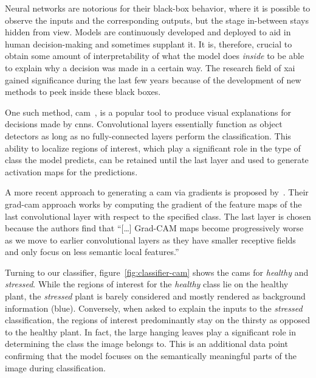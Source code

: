 \documentclass[draft,final]{vutinfth} %
\begin{document}
Neural networks are notorious for their black-box behavior, where it
is possible to observe the inputs and the corresponding outputs, but
the stage in-between stays hidden from view. Models are continuously
developed and deployed to aid in human decision-making and sometimes
supplant it. It is, therefore, crucial to obtain some amount of
interpretability of what the model does \emph{inside} to be able to
explain why a decision was made in a certain way. The research field
of \gls{xai} gained significance during the last few years because of
the development of new methods to peek inside these black boxes.

One such method, \gls{cam}~\cite{zhou2015}, is a popular tool to
produce visual explanations for decisions made by
\glspl{cnn}. Convolutional layers essentially function as object
detectors as long as no fully-connected layers perform the
classification. This ability to localize regions of interest, which
play a significant role in the type of class the model predicts, can
be retained until the last layer and used to generate activation maps
for the predictions.

A more recent approach to generating a \gls{cam} via gradients is
proposed by~\textcite{selvaraju2020}. Their \gls{grad-cam} approach
works by computing the gradient of the feature maps of the last
convolutional layer with respect to the specified class. The last
layer is chosen because the authors find that ``[…]  Grad-CAM maps
become progressively worse as we move to earlier convolutional layers
as they have smaller receptive fields and only focus on less semantic
local features.''~\cite[p.5]{selvaraju2020}

Turning to our classifier, figure~\ref{fig:classifier-cam} shows the
\glspl{cam} for \emph{healthy} and \emph{stressed}. While the regions
of interest for the \emph{healthy} class lie on the healthy plant, the
\emph{stressed} plant is barely considered and mostly rendered as
background information (blue). Conversely, when asked to explain the
inputs to the \emph{stressed} classification, the regions of interest
predominantly stay on the thirsty as opposed to the healthy plant. In
fact, the large hanging leaves play a significant role in determining
the class the image belongs to. This is an additional data point
confirming that the model focuses on the semantically meaningful parts
of the image during classification.
\end{document}
